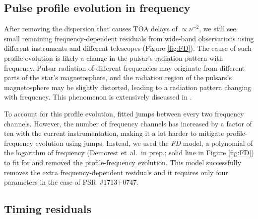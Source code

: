 \subsection{Pulse profile evolution in frequency}
\label{sec:FD}
After removing the dispersion that causes TOA delays of $\propto \nu^{-2}$,
 we still see small remaining frequency-dependent residuals from wide-band
observations using
different instruments and different telescopes (Figure \ref{fig:FD}).  
The cause of such profile evolution is likely a change in the pulsar's
radiation pattern with frequency.  Pulsar radiation of different frequencies may originate from
different parts of the star's magnetosphere, and 
the radiation region of the pulsars's magnetosphere may be slightly distorted,
leading to a radiation pattern changing with frequency. This phenomenon is extensively discussed in \citet{pdr14}. 

To account for this profile evolution, \citet{sns+05} fitted jumps
between every two frequency channels. However, the number of frequency
channels has increased by a factor of ten with the current instrumentation, making it a lot harder to mitigate profile-frequency evolution using jumps. 
Instead, we used the {\it FD} model, a polynomial of the logarithm of
frequency (Demorest et~al.\ in prep.; solid line in Figure
\ref{fig:FD}) to fit for and removed the profile-frequency
evolution. This model successfully removes the extra
frequency-dependent residuals and it requires only four parameters in the
case of PSR~J1713+0747.



\subsection{Timing residuals}
\label{sec:res}

